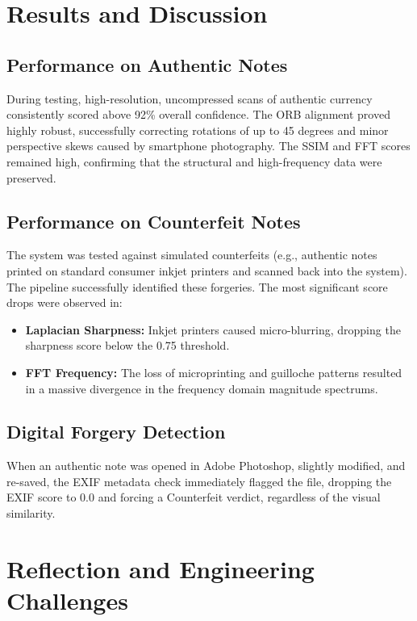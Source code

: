 \documentclass[12pt,a4paper]{article}
\begin{document}
\newpage

\section{Results and Discussion}

\subsection{Performance on Authentic Notes}
During testing, high-resolution, uncompressed scans of authentic currency consistently scored above 92\% overall confidence. The ORB alignment proved highly robust, successfully correcting rotations of up to 45 degrees and minor perspective skews caused by smartphone photography. The SSIM and FFT scores remained high, confirming that the structural and high-frequency data were preserved.

\subsection{Performance on Counterfeit Notes}
The system was tested against simulated counterfeits (e.g., authentic notes printed on standard consumer inkjet printers and scanned back into the system). The pipeline successfully identified these forgeries. The most significant score drops were observed in:
\begin{itemize}
    \item \textbf{Laplacian Sharpness:} Inkjet printers caused micro-blurring, dropping the sharpness score below the 0.75 threshold.
    \item \textbf{FFT Frequency:} The loss of microprinting and guilloche patterns resulted in a massive divergence in the frequency domain magnitude spectrums.
\end{itemize}

\subsection{Digital Forgery Detection}
When an authentic note was opened in Adobe Photoshop, slightly modified, and re-saved, the EXIF metadata check immediately flagged the file, dropping the EXIF score to 0.0 and forcing a Counterfeit verdict, regardless of the visual similarity.

\newpage

\section{Reflection and Engineering Challenges}
\end{document}
